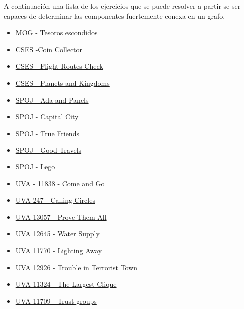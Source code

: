 A continuación una lista de los ejercicios que se puede resolver a partir se ser capaces de determinar las componentes fuertemente conexa en un grafo.

\begin{itemize}
	\item \href{https://matcomgrader.com/problem/49/tesoros-escondidos/}{MOG - Tesoros escondidos}
	\item \href{https://cses.fi/problemset/task/1686}{CSES -Coin Collector}
	\item \href{https://cses.fi/problemset/task/1683}{CSES - Flight Routes Check}
	\item \href{https://cses.fi/problemset/task/1682}{CSES - Planets and Kingdoms}
	\item \href{http://www.spoj.com/problems/ADAPANEL/}{SPOJ - Ada and Panels}
	\item \href{http://www.spoj.com/problems/CAPCITY/}{SPOJ - Capital City}
	\item \href{http://www.spoj.com/problems/TFRIENDS/}{SPOJ - True Friends}
	\item \href{http://www.spoj.com/problems/GOODA/}{SPOJ - Good Travels}
	\item \href{http://www.spoj.com/problems/LEGO/}{SPOJ - Lego}
	\item \href{https://uva.onlinejudge.org/index.php?option=com_onlinejudge&Itemid=8&page=show_problem&problem=2938}{UVA - 11838 - Come and Go}
	\item \href{https://uva.onlinejudge.org/index.php?option=onlinejudge&page=show_problem&problem=183}{UVA 247 - Calling Circles}
	\item \href{https://uva.onlinejudge.org/index.php?option=com_onlinejudge&Itemid=8&page=show_problem&problem=4955}{UVA 13057 - Prove Them All}
	\item \href{https://uva.onlinejudge.org/index.php?option=com_onlinejudge&Itemid=8&page=show_problem&problem=4393}{UVA 12645 - Water Supply}
	\item \href{https://uva.onlinejudge.org/index.php?option=com_onlinejudge&Itemid=8&page=show_problem&problem=2870}{UVA 11770 - Lighting Away}
	\item \href{https://uva.onlinejudge.org/index.php?option=com_onlinejudge&Itemid=8&category=862&page=show_problem&problem=4805}{UVA 12926 - Trouble in Terrorist Town}
	\item \href{https://uva.onlinejudge.org/index.php?option=com_onlinejudge&Itemid=8&page=show_problem&problem=2299}{UVA 11324 - The Largest Clique}
	\item \href{https://uva.onlinejudge.org/index.php?option=com_onlinejudge&Itemid=8&page=show_problem&problem=2756}{UVA 11709 - Trust groups}

\end{itemize}
